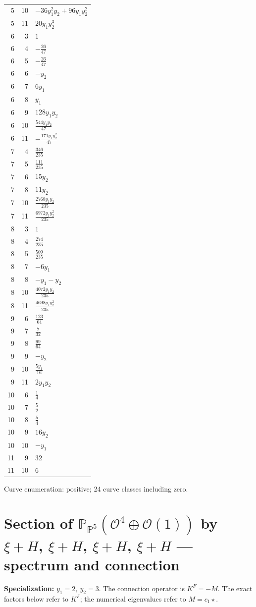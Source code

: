\documentclass[10pt,a4paper]{article}
\begin{document}
{\begin{longtable}{rrp{125mm}}
5 & 10 & $- 36 y_{1}^{2} y_{2} + 96 y_{1} y_{2}^{2}$\\
5 & 11 & $20 y_{1} y_{2}^{3}$\\
6 & 3 & $1$\\
6 & 4 & $- \frac{26}{47}$\\
6 & 5 & $- \frac{26}{47}$\\
6 & 6 & $- y_{2}$\\
6 & 7 & $6 y_{1}$\\
6 & 8 & $y_{1}$\\
6 & 9 & $128 y_{1} y_{2}$\\
6 & 10 & $\frac{544 y_{1} y_{2}}{47}$\\
6 & 11 & $- \frac{171 y_{1} y_{2}^{2}}{47}$\\
7 & 4 & $\frac{346}{235}$\\
7 & 5 & $\frac{111}{235}$\\
7 & 6 & $15 y_{2}$\\
7 & 8 & $11 y_{2}$\\
7 & 10 & $\frac{2768 y_{1} y_{2}}{235}$\\
7 & 11 & $\frac{6972 y_{1} y_{2}^{2}}{235}$\\
8 & 3 & $1$\\
8 & 4 & $\frac{274}{235}$\\
8 & 5 & $\frac{509}{235}$\\
8 & 7 & $- 6 y_{1}$\\
8 & 8 & $- y_{1} - y_{2}$\\
8 & 10 & $\frac{4072 y_{1} y_{2}}{235}$\\
8 & 11 & $\frac{4698 y_{1} y_{2}^{2}}{235}$\\
9 & 6 & $\frac{123}{64}$\\
9 & 7 & $\frac{7}{32}$\\
9 & 8 & $\frac{99}{64}$\\
9 & 9 & $- y_{2}$\\
9 & 10 & $\frac{5 y_{1}}{16}$\\
9 & 11 & $2 y_{1} y_{2}$\\
10 & 6 & $\frac{1}{4}$\\
10 & 7 & $\frac{5}{2}$\\
10 & 8 & $\frac{5}{4}$\\
10 & 9 & $16 y_{2}$\\
10 & 10 & $- y_{1}$\\
11 & 9 & $32$\\
11 & 10 & $6$\\
\end{longtable}}
Curve enumeration: positive; 24 curve classes including zero.
\clearpage\section*{Section of $\mathbb P_{\mathbb P^{5}}(\mathcal O^{4}\oplus \mathcal O(1))$ by $\xi +H$, $\xi +H$, $\xi +H$, $\xi +H$ --- spectrum and connection}
\textbf{Specialization:} $y_1=2,\ y_2=3$. The connection operator is $K^F=-M$. The exact factors below refer to $K^F$; the numerical eigenvalues refer to $M=c_1\star$.
\end{document}
